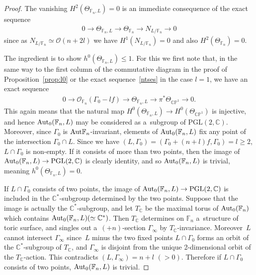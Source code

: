 \documentclass[11pt]{article}
\numberwithin{equation}{section}
\begin{document}
\begin{proof}
The vanishing $H^2 (\Theta_{\mathbb{F}_n, L}) =0$ is an immediate consequence of the exact sequence
\begin{gather}
\label{ses:56}
0
\longrightarrow
\Theta_{\mathbb{F}_n,L}
\longrightarrow
\Theta_{\mathbb{F}_n}
\longrightarrow
N_{L/\mathbb{F}_n}
\longrightarrow
0
\end{gather}
since as $N_{L/\mathbb{F}_n}\simeq\mathscr O(n+2l)$ we have $H^1(N_{L/\mathbb{F}_n}) = 0$ and also
$H^2(\Theta_{\mathbb{F}_n}) =0$.

{\sloppy The ingredient is to show $h^0(\Theta_{\mathbb{F}_n, L}) \le 1$.
For this we f\/irst note that, in the same way to the f\/irst column of the commutative diagram in the proof of
Proposition~\ref{prop:l0} or the exact sequence~\eqref{ntses} in the case $l=1$, we have an exact sequence
\begin{gather*}%
0
\longrightarrow
\mathscr O_{\mathbb{F}_n} (\Gamma_0 - lf )
\longrightarrow
\Theta_{\mathbb{F}_n,L}
\longrightarrow
\pi^*\Theta_{\mathbb{CP}^1}
\longrightarrow
0.
\end{gather*}
This again means that the natural map $H^0(\Theta_{\mathbb{F}_n,L} ) \to H^0(\Theta_{\mathbb{CP}^1})$ is injective, and
hence ${\rm{Aut}}_0(\mathbb{F}_n,L)$ may be considered as a~subgroup of $\mathrm{PGL}(2,\mathbb{C})$.
Moreover, since $\Gamma_0$ is ${\rm{Aut}}\mathbb{F}_n$-invariant, ele\-ments of ${\rm{Aut}}_0(\mathbb{F}_n,L)$ f\/ix any
point of the intersection $\Gamma_0\cap L$.
Since we have $(L,\Gamma_0)=(\Gamma_0 + (n+l)f,\Gamma_0) = l\ge 2$, $L\cap \Gamma_0$ is non-empty.
If it consists of more than two points, then the image of ${\rm{Aut}}_0(\mathbb{F}_n,L)\to \mathrm{PGL}(2,\mathbb{C})$
is clearly identity, and so ${\rm{Aut}}_0(\mathbb{F}_n,L)$ is trivial, meaning $h^0(\Theta_{\mathbb{F}_n,L})=0$.

}

If $L\cap \Gamma_0$ consists of two points, the image of ${\rm{Aut}}_0(\mathbb{F}_n,L)\to \mathrm{PGL}(2,\mathbb{C})$ is
included in the $\mathbb{C}^*$-subgroup determined by the two points.
Suppose that the image is actually the $\mathbb{C}^*$-subgroup, and let $T_{\mathbb{C}}$ be the maximal torus of
${\rm{Aut}}_0(\mathbb{F}_n)$ which contains ${\rm{Aut}}_0(\mathbb{F}_n,L)(\simeq \mathbb{C}^*)$.
Then $T_{\mathbb{C}}$ determines on $\mathbb{F}_n$ a~structure of toric surface, and singles out a~$(+n)$-section
$\Gamma_{\infty}$ by $T_{\mathbb{C}}$-invariance.
Moreover~$L$ cannot intersect $\Gamma_{\infty}$ since~$L$ minus the two f\/ixed points $L\cap\Gamma_0$ forms an orbit of
the $\mathbb{C}^*$-subgroup of $T_{\mathbb{C}}$, and $\Gamma_{\infty}$ is disjoint from the unique 2-dimensional orbit
of the $T_{\mathbb{C}}$-action.
This contradicts $(L,\Gamma_{\infty})=n+l$ $(>0)$.
Therefore if $L\cap \Gamma_0$ consists of two points, ${\rm{Aut}}_0(\mathbb{F}_n,L)$ is trivial.


\end{proof}
\end{document}
